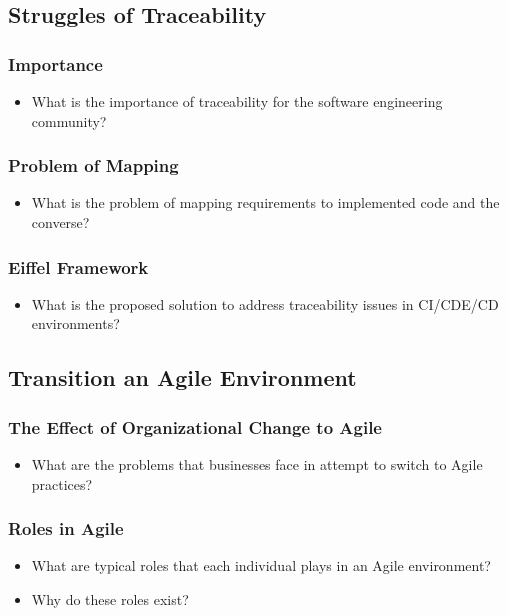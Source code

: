 \documentclass[11pt,a4paper]{article}
\begin{document}
	\subsection{Struggles of Traceability}
		\subsubsection{Importance}
		\begin{itemize}[noitemsep]
			\item What is the importance of traceability for the software engineering community?
		\end{itemize}
		\subsubsection{Problem of Mapping}
		\begin{itemize}[noitemsep]
			\item What is the problem of mapping requirements to implemented code and the converse?
		\end{itemize}
		\subsubsection{Eiffel Framework}
		\begin{itemize}[noitemsep]
			\item What is the proposed solution to address traceability issues in CI/CDE/CD environments?
		\end{itemize}
		
	\subsection{Transition an Agile Environment}
		\subsubsection{The Effect of Organizational Change to Agile}
		\begin{itemize}[noitemsep]
			\item What are the problems that businesses face in attempt to switch to Agile practices?
		\end{itemize}
		\subsubsection{Roles in Agile}
		\begin{itemize}[noitemsep]
			\item What are typical roles that each individual plays in an Agile environment? 
			\item Why do these roles exist?
		\end{itemize}
\end{document}
